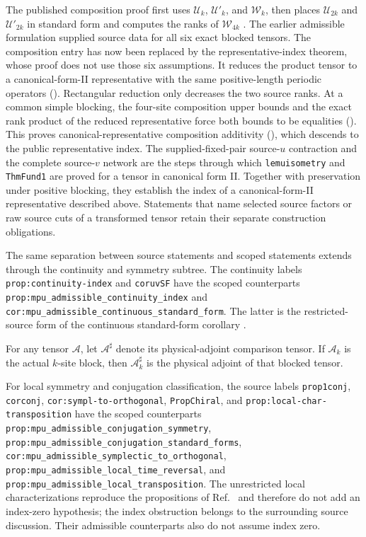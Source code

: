 \documentclass{article}
\begin{document}
The published composition proof first uses $\mathcal U_k$,
$\mathcal U'_k$, and $\mathcal W_k$, then places $\mathcal U_{2k}$ and
$\mathcal U'_{2k}$ in standard form and computes the ranks of
$\mathcal W_{4k}$ \cite{Cirac2017MPU}. The earlier admissible formulation
supplied source data for all six exact blocked tensors. The composition entry
has now been replaced by the representative-index theorem, whose proof does
not use those six assumptions. It reduces the product tensor to a
canonical-form-II representative with the same positive-length periodic
operators (). Rectangular
reduction only decreases the two source ranks. At a common simple blocking,
the four-site composition upper bounds and the exact rank product of the
reduced representative force both bounds to be equalities
().
This proves canonical-representative composition additivity
(),
which descends to the public representative index.
The supplied-fixed-pair source-$u$
contraction and the complete source-$v$ network are the steps through which
\texttt{lemuisometry} and \texttt{ThmFund1} are proved for a tensor in
canonical form II. Together with preservation under positive blocking, they
establish the index of a canonical-form-II representative described above.
Statements that name selected source factors or raw source cuts of a
transformed tensor retain their separate construction obligations.

The same separation between source statements and scoped statements extends
through the continuity and symmetry subtree. The continuity labels
\texttt{prop:continuity-index} and \texttt{coruvSF} have the scoped
counterparts \texttt{prop:mpu\_admissible\_continuity\_index} and
\texttt{cor:mpu\_admissible\_continuous\_standard\_form}. The latter is the
restricted-source form of the continuous standard-form corollary
\cite[lines~867--910]{Cirac2017MPU}.

For any tensor $\mathcal A$, let $\mathcal A^\sharp$ denote its
physical-adjoint comparison tensor. If $\mathcal A_k$ is the actual $k$-site
block, then $\mathcal A_k^\sharp$ is the physical adjoint of that blocked
tensor.

For local symmetry and conjugation classification, the source labels
\texttt{prop1conj}, \texttt{corconj},
\texttt{cor:sympl-to-orthogonal}, \texttt{PropChiral}, and
\texttt{prop:local-char-transposition} have the scoped counterparts
\texttt{prop:mpu\_admissible\_conjugation\_symmetry},
\texttt{prop:mpu\_admissible\_conjugation\_standard\_forms},
\texttt{cor:mpu\_admissible\_symplectic\_to\_orthogonal},
\texttt{prop:mpu\_admissible\_local\_time\_reversal}, and
\texttt{prop:mpu\_admissible\_local\_transposition}. The unrestricted local
characterizations reproduce the propositions of Ref.~\cite{Cirac2017MPU} and
therefore do not add an index-zero hypothesis; the index obstruction belongs
to the surrounding source discussion. Their admissible counterparts also do
not assume index zero.
\end{document}
